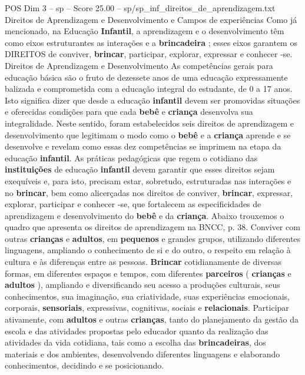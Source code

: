 \begin{textsample}{POS Dim 3 – sp – Score 25.00 – sp/sp\_inf\_direitos\_de\_aprendizagem.txt}  \label{ex:f3_pos_201}
Direitos de Aprendizagem e Desenvolvimento e Campos de experiências Como já mencionado, na Educação \textbf{Infantil}, a aprendizagem e o desenvolvimento têm como eixos estruturantes as interações e a \textbf{brincadeira} ; esses eixos garantem os DIREITOS de conviver, \textbf{brincar}, participar, explorar, expressar e conhecer -se.
Direitos de Aprendizagem e Desenvolvimento As competências gerais para educação básica são o fruto de dezessete anos de uma educação expressamente balizada e comprometida com a educação integral do estudante, de 0 a 17 anos.
Isto significa dizer que desde a educação \textbf{infantil} devem ser promovidas situações e oferecidas condições para que cada \textbf{bebê} e \textbf{criança} desenvolva sua integralidade.
Neste sentido, foram estabelecidos seis direitos de aprendizagem e desenvolvimento que legitimam o modo como o \textbf{bebê} e a \textbf{criança} aprende e se desenvolve e revelam como essas dez competências se imprimem na etapa da educação \textbf{infantil}.
As práticas pedagógicas que regem o cotidiano das \textbf{instituições} de educação \textbf{infantil} devem garantir que esses direitos sejam exequíveis e, para isto, precisam estar, sobretudo, estruturadas nas interações e no \textbf{brincar}, bem como alicerçadas nos direitos de conviver, \textbf{brincar}, expressar, explorar, participar e conhecer -se, que fortalecem as especificidades de aprendizagem e desenvolvimento do \textbf{bebê} e da \textbf{criança}.
Abaixo trouxemos o quadro que apresenta os direitos de aprendizagem na BNCC, p. 38.
Conviver com outras \textbf{crianças} e \textbf{adultos}, em \textbf{pequenos} e grandes grupos, utilizando diferentes linguagens, ampliando o conhecimento de si e do outro, o respeito em relação à cultura e às diferenças entre as pessoas. \textbf{Brincar} cotidianamente de diversas formas, em diferentes espaços e tempos, com diferentes \textbf{parceiros} ( \textbf{crianças} e \textbf{adultos} ), ampliando e diversificando seu acesso a produções culturais, seus conhecimentos, sua imaginação, sua criatividade, suas experiências emocionais, corporais, \textbf{sensoriais}, expressivas, cognitivas, sociais e \textbf{relacionais}.
Participar ativamente, com \textbf{adultos} e outras \textbf{crianças}, tanto do planejamento da gestão da escola e das atividades propostas pelo educador quanto da realização das atividades da vida cotidiana, tais como a escolha das \textbf{brincadeiras}, dos materiais e dos ambientes, desenvolvendo diferentes linguagens e elaborando conhecimentos, decidindo e se posicionando.

\end{textsample}
